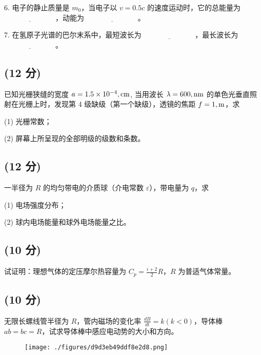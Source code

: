 6. 电子的静止质量是 $m_0$，当电子以 $v = 0.5c$ 的速度运动时，它的总能量为 $\underline{\hspace{3cm}}$，动能为 $\underline{\hspace{3cm}}$。

7. 在氢原子光谱的巴尔末系中，最短波长为 $\underline{\hspace{3cm}}$，最长波长为 $\underline{\hspace{3cm}}$。
\subsection{(12 分)}
已知光栅狭缝的宽度 $a = 1.5 \times 10^{-4} \\, \text{cm}$, 当用波长 $\lambda = 600 \\, \text{nm}$ 的单色光垂直照射在光栅上时，发现第 4 级缺级（第一个缺级），透镜的焦距 $f = 1 \\, \text{m}$，求

(1) 光栅常数；

(2) 屏幕上所呈现的全部明级的级数和条数。
\subsection{(12 分)}
一半径为 $R$ 的均匀带电的介质球（介电常数 $\varepsilon$），带电量为 $q$，求

(1) 电场强度分布；

(2) 球内电场能量和球外电场能量之比。
\subsection{(10 分)}
试证明：理想气体的定压摩尔热容量为 $C_p = \frac{i + 2}{2} R$，$R$ 为普适气体常量。
\subsection{(10 分)}
无限长螺线管半径为 $R$，管内磁场的变化率 $\frac{dB}{dt} = k (k < 0)$，导体棒 $ab = bc = R$，试求导体棒中感应电动势的大小和方向。
\begin{figure}[ht]
\centering
\texttt{[image: ./figures/d9d3eb49ddf8e2d8.png]}
\caption{} \label{fig_NJU08_3}
\end{figure}
